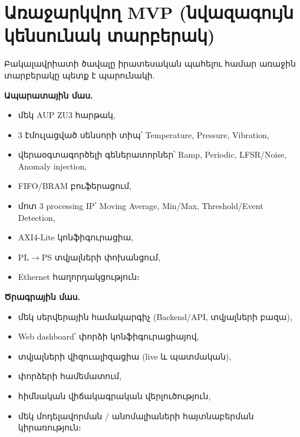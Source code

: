 \chapter{Առաջարկվող MVP (նվազագույն կենսունակ տարբերակ)}

Բակալավրիատի ծավալը իրատեսական պահելու համար առաջին տարբերակը պետք է պարունակի.

\textbf{Ապարատային մաս.}
\begin{itemize}[leftmargin=1.4em]
  \item մեկ AUP ZU3 հարթակ,
  \item 3 էմուլացված սենսորի տիպ՝ Temperature, Pressure, Vibration,
  \item վերաօգտագործելի գեներատորներ՝ Ramp, Periodic, LFSR/Noise, Anomaly injection,
  \item FIFO/BRAM բուֆերացում,
  \item մոտ 3 processing IP՝ Moving Average, Min/Max, Threshold/Event Detection,
  \item AXI4-Lite կոնֆիգուրացիա,
  \item PL$\rightarrow$PS տվյալների փոխանցում,
  \item Ethernet հաղորդակցություն։
\end{itemize}

\textbf{Ծրագրային մաս.}
\begin{itemize}[leftmargin=1.4em]
  \item մեկ սերվերային համակարգիչ (Backend/API, տվյալների բազա),
  \item Web dashboard՝ փորձի կոնֆիգուրացիայով,
  \item տվյալների վիզուալիզացիա (live և պատմական),
  \item փորձերի համեմատում,
  \item հիմնական վիճակագրական վերլուծություն,
  \item մեկ մոդելավորման / անոմալիաների հայտնաբերման կիրառություն։
\end{itemize}
